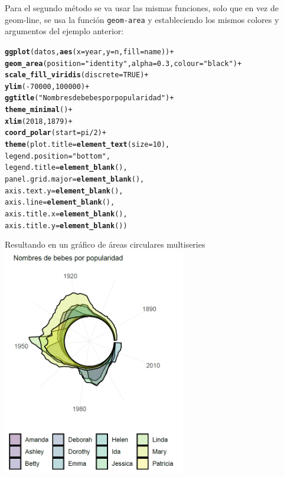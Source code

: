 \documentclass{article}\usepackage[]{graphicx}\usepackage[]{color}
\makeatletter
\newcommand{\hlnum}[1]{\textcolor[rgb]{0.686,0.059,0.569}{#1}}%
\newcommand{\hlstr}[1]{\textcolor[rgb]{0.192,0.494,0.8}{#1}}%
\newcommand{\hlopt}[1]{\textcolor[rgb]{0,0,0}{#1}}%
\newcommand{\hlstd}[1]{\textcolor[rgb]{0.345,0.345,0.345}{#1}}%
\newcommand{\hlkwc}[1]{\textcolor[rgb]{0.333,0.667,0.333}{#1}}%
\newcommand{\hlkwd}[1]{\textcolor[rgb]{0.737,0.353,0.396}{\textbf{#1}}}%
\newenvironment{kframe}{%
 \def\at@end@of@kframe{}%
 \ifinner\ifhmode%
  \def\at@end@of@kframe{\end{minipage}}%
  \begin{minipage}{\columnwidth}%
 \fi\fi%
 \def\FrameCommand##1{\hskip\@totalleftmargin \hskip-\fboxsep
 \colorbox{shadecolor}{##1}\hskip-\fboxsep
     \hskip-\linewidth \hskip-\@totalleftmargin \hskip\columnwidth}%
 \MakeFramed {\advance\hsize-\width
   \@totalleftmargin\z@ \linewidth\hsize
   \@setminipage}}%
 {\par\unskip\endMakeFramed%
 \at@end@of@kframe}
\newenvironment{knitrout}{}{} %
\makeatother
\begin{document}
\clearpage
Para el segundo m\'etodo se va usar las mismas funciones, solo que en vez de geom-line, se usa la funci\'on \texttt{geom-area} y estableciendo los mismos colores y argumentos del ejemplo anterior:
\begin{knitrout}
\color{fgcolor}\begin{kframe}
\begin{alltt}
\hlkwd{ggplot}\hlstd{(datos,} \hlkwd{aes}\hlstd{(}\hlkwc{x}\hlstd{=year,} \hlkwc{y}\hlstd{=n,} \hlkwc{fill} \hlstd{= name))} \hlopt{+}
  \hlkwd{geom_area}\hlstd{(}\hlkwc{position} \hlstd{=} \hlstr{"identity"}\hlstd{,}\hlkwc{alpha}\hlstd{=}\hlnum{0.3}\hlstd{,} \hlkwc{colour}\hlstd{=} \hlstr{"black"}\hlstd{)} \hlopt{+}
  \hlkwd{scale_fill_viridis}\hlstd{(}\hlkwc{discrete} \hlstd{=} \hlnum{TRUE}\hlstd{)} \hlopt{+}
  \hlkwd{ylim}\hlstd{(}\hlopt{-}\hlnum{70000}\hlstd{,}\hlnum{100000}\hlstd{)} \hlopt{+}
  \hlkwd{ggtitle}\hlstd{(}\hlstr{"Nombres de bebes por popularidad"}\hlstd{)} \hlopt{+}
  \hlkwd{theme_minimal}\hlstd{()} \hlopt{+}
  \hlkwd{xlim}\hlstd{(}\hlnum{2018}\hlstd{,} \hlnum{1879}\hlstd{)} \hlopt{+}
  \hlkwd{coord_polar}\hlstd{(}\hlkwc{start} \hlstd{= pi}\hlopt{/}\hlnum{2}\hlstd{)} \hlopt{+}
  \hlkwd{theme}\hlstd{(}\hlkwc{plot.title} \hlstd{=} \hlkwd{element_text}\hlstd{(}\hlkwc{size}\hlstd{=}\hlnum{10}\hlstd{),}
        \hlkwc{legend.position} \hlstd{=} \hlstr{"bottom"}\hlstd{,}
        \hlkwc{legend.title} \hlstd{=} \hlkwd{element_blank}\hlstd{(),}
        \hlkwc{panel.grid.major} \hlstd{=} \hlkwd{element_blank}\hlstd{(),}
        \hlkwc{axis.text.y} \hlstd{=} \hlkwd{element_blank}\hlstd{(),}
        \hlkwc{axis.line} \hlstd{=} \hlkwd{element_blank}\hlstd{(),}
        \hlkwc{axis.title.x} \hlstd{=} \hlkwd{element_blank}\hlstd{(),}
        \hlkwc{axis.title.y} \hlstd{=} \hlkwd{element_blank}\hlstd{())}
\end{alltt}
\end{kframe}
\end{knitrout}
Resultando en un gr\'afico de \'areas circulares multiseries~\\
\vbox{
    \centering
    \includegraphics[width=0.6\textwidth]{imag/area}
}
\clearpage
\end{document}
